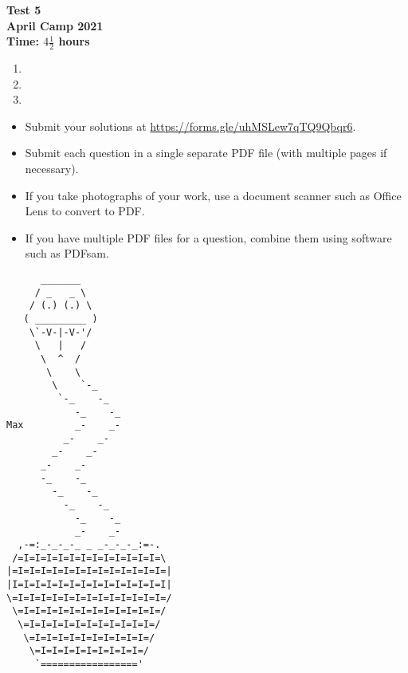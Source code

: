 \documentclass{article}
\begin{document}
\thispagestyle{empty}

\begin{center}
  \textbf{\Large Test 5}
  \\ \vspace{1em}
  \textbf{\large April Camp 2021}
  \\ \vspace{1em}
  \textbf{\large Time: $4\frac{1}{2}$ hours}
\end{center}

\vspace{24pt}

\begin{enumerate}[itemsep=18pt]

\item


\item


\item

\end{enumerate}


\vfill
\begin{itemize}
	\item Submit your solutions at \url{https://forms.gle/uhMSLew7qTQ9Qbqr6}.
	\item Submit each question in a single separate PDF file (with multiple pages if necessary).
	\item If you take photographs of your work, use a document scanner such as Office Lens to convert to PDF.
	\item If you have multiple PDF files for a question, combine them using software such as PDFsam.
\end{itemize}

\vfill
\centering
\begin{BVerbatim}
      _______
     / _   _ \
    / (.) (.) \
   ( _________ )
    \`-V-|-V-'/
     \   |   /
      \  ^  /
       \    \
        \    `-_
         `-_    -_
            -_    -_
Max         _-    _-
          _-    _-
        _-    _-
      _-    _-
      -_    -_
        -_    -_
          -_    -_
            -_    -_
            _-    _-
  ,-=:_-_-_-_ _ _-_-_-_:=-.
 /=I=I=I=I=I=I=I=I=I=I=I=I=\
|=I=I=I=I=I=I=I=I=I=I=I=I=I=|
|I=I=I=I=I=I=I=I=I=I=I=I=I=I|
\=I=I=I=I=I=I=I=I=I=I=I=I=I=/
 \=I=I=I=I=I=I=I=I=I=I=I=I=/
  \=I=I=I=I=I=I=I=I=I=I=I=/
   \=I=I=I=I=I=I=I=I=I=I=/
    \=I=I=I=I=I=I=I=I=I=/
     `================='
\end{BVerbatim}
\end{document}
